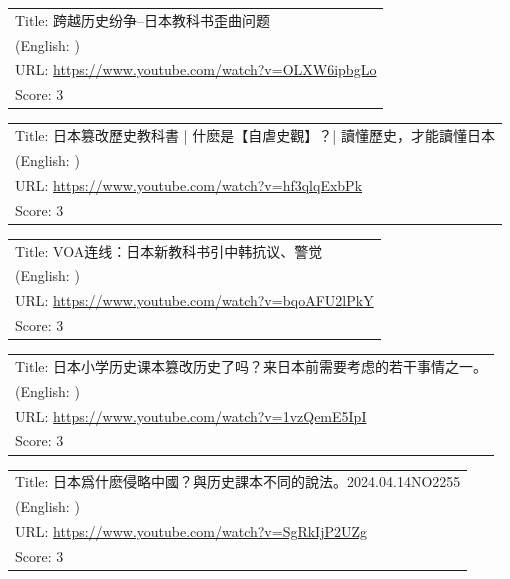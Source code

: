 \documentclass{article}
\begin{document}
\noindent
\begin{tabular}{p{}}
Title: 跨越历史纷争--日本教科书歪曲问题 \\
(English: ) \\
URL: \url{https://www.youtube.com/watch?v=OLXW6ipbgLo} \\
Score: 3 \\
\end{tabular}
\vspace{0.5em}

\noindent
\begin{tabular}{p{}}
Title: 日本篡改歷史教科書 | 什麽是【自虐史觀】？| 讀懂歷史，才能讀懂日本 \\
(English: ) \\
URL: \url{https://www.youtube.com/watch?v=hf3qlqExbPk} \\
Score: 3 \\
\end{tabular}
\vspace{0.5em}

\noindent
\begin{tabular}{p{}}
Title: VOA连线：日本新教科书引中韩抗议、警觉 \\
(English: ) \\
URL: \url{https://www.youtube.com/watch?v=bqoAFU2lPkY} \\
Score: 3 \\
\end{tabular}
\vspace{0.5em}

\noindent
\begin{tabular}{p{}}
Title: 日本小学历史课本篡改历史了吗？来日本前需要考虑的若干事情之一。 \\
(English: ) \\
URL: \url{https://www.youtube.com/watch?v=1vzQemE5IpI} \\
Score: 3 \\
\end{tabular}
\vspace{0.5em}

\noindent
\begin{tabular}{p{}}
Title: 日本爲什麽侵略中國？與历史課本不同的說法。2024.04.14NO2255 \\
(English: ) \\
URL: \url{https://www.youtube.com/watch?v=SgRkIjP2UZg} \\
Score: 3 \\
\end{tabular}
\vspace{0.5em}
\end{document}
